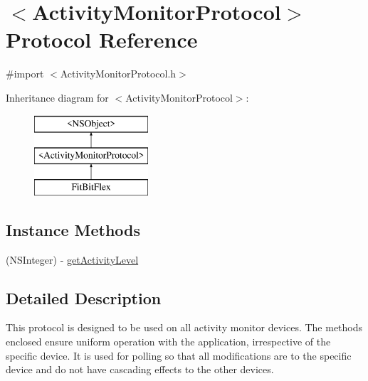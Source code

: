 \hypertarget{protocol_activity_monitor_protocol-p}{\section{$<$Activity\-Monitor\-Protocol$>$ Protocol Reference}
\label{protocol_activity_monitor_protocol-p}
}


{\ttfamily \#import $<$Activity\-Monitor\-Protocol.\-h$>$}

Inheritance diagram for $<$Activity\-Monitor\-Protocol$>$\-:\begin{figure}[H]
\begin{center}
\leavevmode
\includegraphics[height=3.000000cm]{protocol_activity_monitor_protocol-p}
\end{center}
\end{figure}
\subsection*{Instance Methods}
\begin{DoxyCompactItemize}
\item 
(N\-S\-Integer) -\/ \hyperlink{protocol_activity_monitor_protocol-p_a3c4e5219c201426d8c1bffa0856a4e3c}{get\-Activity\-Level}
\end{DoxyCompactItemize}


\subsection{Detailed Description}
This protocol is designed to be used on all activity monitor devices. The methods enclosed ensure uniform operation with the application, irrespective of the specific device. It is used for polling so that all modifications are to the specific device and do not have cascading effects to the other devices. 

